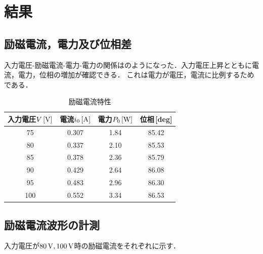 \clearpage

\section{結果}
\subsection{励磁電流，電力及び位相差}
入力電圧-励磁電流-電力-電力の関係はのようになった．入力電圧上昇とともに電流，電力，位相の増加が確認できる．
	これは電力が電圧，電流に比例するためである．
	\begin{table}[h]
	\centering
	\caption{励磁電流特性}
	\label{tab:re1}
	\begin{tabular}{cccc}
	\hline
	入力電圧$V\,[\rm{V}]$& 電流$i_{0}\,[\rm{A}]$& 電力$P_{0}\,[\rm{W}]$& 位相\,[\rm{deg}]  \\ 
	\hline
	75  & 0.307    & 1.84     & 85.42 \\
	80  & 0.337    & 2.10      & 85.53 \\
	85  & 0.378    & 2.36     & 85.79 \\
	90  & 0.429    & 2.64     & 86.08 \\
	95  & 0.483    & 2.96     & 86.30 \\
	100 & 0.552    & 3.34     & 86.53 \\ \hline
	\end{tabular}
	\end{table}
	
\subsection{励磁電流波形の計測}
入力電圧が$80\,\rm{V}, 100\,\rm{V}$時の励磁電流をそれぞれに示す．

